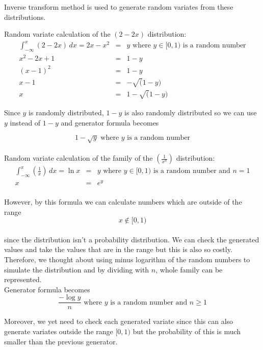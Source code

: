 \documentclass[12pt,a4paper]{report}
\begin{document}
	Inverse transform method is used to generate random variates from these distributions.

	Random variate calculation of the $(2-2x)$ distribution:
	\begin{eqnarray*}
		 \int_{-\infty}^x \!  (2-2x)\, dx  = 2x -  x^2  & = & y \text{ where } y \in [0, 1) \text{ is a random number}\\
		x^2-2x+1 & = & 1 - y \\
		(x-1)^2 & = & 1 - y \\
		x - 1 & = & -\sqrt (1 - y) \\
		x & = & 1 - \sqrt(1-y)
	\end{eqnarray*}

	Since $y$ is randomly distributed, $1-y$ is also randomly distributed so we can use $y$ instead of $1-y$ and generator formula becomes 

	$$1-\sqrt y  \text{ where } y \text{ is a random number}$$ \\
		
	Random variate calculation of the family of the $(\frac{1}{x^n})$ distribution:
	\begin{eqnarray*}
		 \int_{-\infty}^x \!  (\frac{1}{x})\, dx  = \ln x & = & y \text{ where } y \in [0, 1) \text{ is a random number and } n = 1\\
		x & = & e^y \\
	\end{eqnarray*}

	However, by this formula we can calculate numbers which are outside of the range \\

	$$x \not\in [0, 1)$$ \\

	since the distribution isn't a probability distribution. We can check the generated values and take the values that are in the range but this is also so costly.\\

	Therefore, we thought about using minus logarithm of the random numbers to simulate the distribution and by dividing with $n$, whole family can be represented. \\

	Generator formula becomes\\
	
	$$\frac{-\log y}{n} \text{ where } y \text{ is a random number and } n \ge 1 $$

	Moreover, we yet need to check each generated variate since this can also generate variates outside the range $[0, 1)$ but the probability of this is much smaller than the previous generator.
\end{document}
